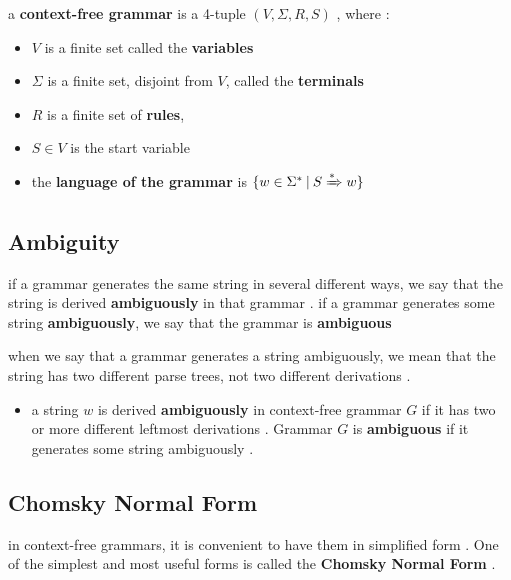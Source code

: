 \documentclass[12pt]{article}
\begin{document}
\begin{tcolorbox}
a \textbf{context-free grammar} is a 4-tuple $( V , \Sigma , R , S )$ , where :
\begin{itemize}
	\item $V$ is a finite set called the \textbf{variables}
	\item $\Sigma$ is a finite set, disjoint from $V$, called the \textbf{terminals}
	\item $R$ is a finite set of \textbf{rules},
	\item $S \in V$ is the start variable
\end{itemize}
\end{tcolorbox}


\begin{tcolorbox}
\begin{itemize}
	\item the \textbf{language of the grammar} is $\{ w \in \Sigma^{*} \: | \: S \xRightarrow{*} w \}$
\end{itemize}
\end{tcolorbox}


\subsection{Ambiguity}


if a grammar generates the same string in several different ways, we say that the string is derived \textbf{ambiguously} in that grammar . if a grammar generates some string \textbf{ambiguously}, we say that the grammar is \textbf{ambiguous}


\noindent
when we say that a grammar generates a string ambiguously, we mean that the string has two different parse trees, not two different derivations .


\begin{tcolorbox}
\begin{itemize}
	\item a string $w$ is derived \textbf{ambiguously} in context-free grammar $G$ if it has two or more different leftmost derivations . Grammar $G$ is \textbf{ambiguous} if it generates some string ambiguously .
\end{itemize}
\end{tcolorbox}


\newpage

\subsection{Chomsky Normal Form}
in context-free grammars, it is convenient to have them in simplified form . One of the simplest and most useful forms is called the \textbf{Chomsky Normal Form} . 
\end{document}
